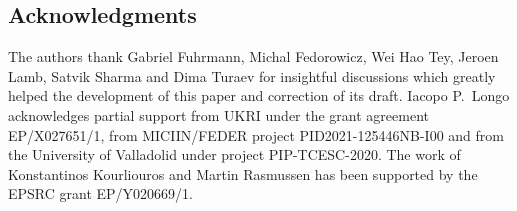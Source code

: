 \documentclass[reqno]{amsart}
\theoremstyle{definition}
\numberwithin{equation}{section}
\begin{document}
\subsection*{Acknowledgments} The authors thank Gabriel Fuhrmann, Michal Fedorowicz, Wei Hao Tey, Jeroen Lamb, Satvik Sharma and Dima Turaev for insightful discussions which greatly helped the development of this paper and correction of its draft. Iacopo P.~Longo acknowledges partial support from UKRI under the grant agreement
EP/X027651/1, from  MICIIN/FEDER project PID2021-125446NB-I00 and from the University of
Valladolid under project PIP-TCESC-2020. The work of Konstantinos Kourliouros and Martin Rasmussen has been supported by the EPSRC grant EP/Y020669/1.  



\end{document}
